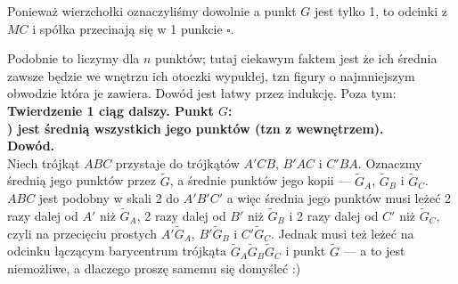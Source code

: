 \documentclass{article}
\begin{document}
Ponieważ wierzchołki oznaczyliśmy dowolnie a punkt $G$ jest tylko 1, to odcinki z $MC$ i spółka przecinają się w 1 punkcie $\square$.
\begin{center}\end{center}
Podobnie to liczymy dla $n$ punktów; tutaj ciekawym faktem jest że ich średnia zawsze będzie we wnętrzu ich otoczki wypukłej, tzn figury o najmniejszym obwodzie która je zawiera.
Dowód jest łatwy przez indukcję.
Poza tym:
\\\textbf{Twierdzenie 1 ciąg dalszy. Punkt $G$:
\\) jest średnią wszystkich jego punktów (tzn z wewnętrzem).
\\Dowód.}
\\Niech trójkąt $ABC$ przystaje do trójkątów $A'CB$, $B'AC$ i $C'BA$. Oznaczmy średnią jego punktów przez $\tilde G$, a średnie punktów jego kopii --- $\tilde G_A$, $\tilde G_B$ i $\tilde G_C$. $ABC$ jest podobny w skali 2 do $A'B'C'$ a więc średnia jego punktów musi leżeć 2 razy dalej od $A'$ niż $\tilde G_A$, 2 razy dalej od $B'$ niż $\tilde G_B$ i 2 razy dalej od $C'$ niż $\tilde G_C$, czyli na przecięciu prostych $A'\tilde G_A$, $B'\tilde G_B$ i $C'\tilde G_C$. Jednak musi też leżeć na odcinku łączącym barycentrum trójkąta $\tilde G_A\tilde G_B\tilde G_C$ i punkt $\tilde G$ --- a to jest niemożliwe, a dlaczego proszę samemu się domyśleć :)
\end{document}
